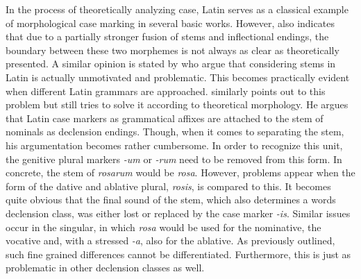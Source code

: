 \documentclass[11pt,a4paper,twoside,openright]{scrbook}
\begin{document}
In the process of theoretically analyzing case, Latin serves as a classical example of morphological case marking in several basic works. However, \citep{blake2012hbocas} also indicates that due to a partially stronger fusion of stems and inflectional endings, the boundary between these two morphemes is not always as clear as theoretically presented. A similar opinion is stated by \citet{embick2005status} who argue that considering stems in Latin is actually unmotivated and problematic. 
This becomes practically evident when different Latin grammars are approached. \citet{panhuis2015lat} similarly points out to this problem but still tries to solve it according to theoretical morphology. He argues that Latin case markers as grammatical affixes are attached to the stem of nominals as declension endings. Though, when it comes to separating the stem, his argumentation becomes rather cumbersome. In order to recognize this unit, the genitive plural markers \textit{-um} or \textit{-rum} need to be removed from this form. In concrete, the stem of \textit{rosarum} would be \textit{rosa}. However, problems appear when the form of the dative and ablative plural, \textit{rosis}, is compared to this. It becomes quite obvious that the final sound of the stem, which also determines a words declension class, was either lost or replaced by the case marker \textit{-is}. Similar issues occur in the singular, in which \textit{rosa} would be used for the nominative, the vocative and, with a stressed \textit{-a}, also for the ablative. As previously outlined, such fine grained differences cannot be differentiated. Furthermore, this is just as problematic in other declension classes as well. 
\end{document}
